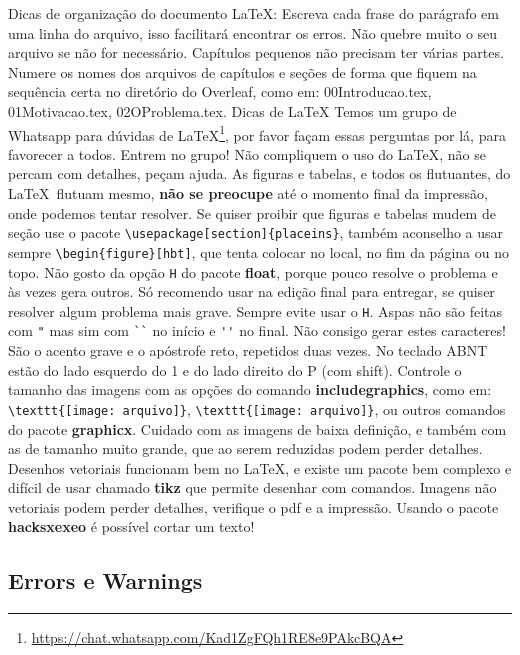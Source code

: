 \documentclass{article}
\begin{document}
\begin{outline}
\begin{outline}
\1 Dicas de organização do documento \LaTeX:
\2 Escreva cada frase do parágrafo em uma linha do arquivo, isso facilitará encontrar os erros.
\2 Não quebre muito o seu arquivo se não for necessário. Capítulos pequenos não precisam ter várias partes.
\2 Numere os nomes dos arquivos de capítulos e seções de forma que fiquem na sequência certa no diretório do Overleaf, como em: 00Introducao.tex, 01Motivacao.tex, 02OProblema.tex.
\1 Dicas de \LaTeX
\2 Temos um grupo de Whatsapp para dúvidas de \LaTeX\footnote{\url{https://chat.whatsapp.com/Kad1ZgFQh1RE8e9PAkcBQA}}, por favor façam essas perguntas por lá, para favorecer a todos. Entrem no grupo!
\2 Não compliquem o uso do \LaTeX, não se percam com detalhes, peçam ajuda. 
\2 As figuras e tabelas, e todos os flutuantes, do \LaTeX\  flutuam mesmo, \textbf{não se preocupe} até o momento final da impressão, onde podemos tentar resolver. 
\2 Se quiser proibir que figuras e tabelas mudem de seção use o pacote \verb!\usepackage[section]{placeins}!, também aconselho a usar sempre \verb!\begin{figure}[hbt]!, que tenta colocar no local, no fim da página ou no topo. 
\3 Não gosto da opção \verb!H! do pacote \textbf{float}, porque pouco resolve o problema e às vezes gera outros. Só recomendo usar na edição final para entregar, se quiser resolver algum problema mais grave. Sempre evite usar o \verb!H!.
\2 Aspas não são feitas com \verb!"! mas sim com \verb!``! no início e \verb!''! no final.
\3 Não consigo gerar estes caracteres! São o acento grave e o apóstrofe reto, repetidos duas vezes. No teclado ABNT estão do lado esquerdo do 1 e do lado direito do P (com shift). 
\2 Controle o tamanho das imagens com as opções do comando \textbf{includegraphics}, como em: \verb!\texttt{[image: arquivo]}!, \verb!\texttt{[image: arquivo]}!, ou outros comandos do pacote \textbf{graphicx}.
\2 Cuidado com as imagens de baixa definição, e também com as de tamanho muito grande, que ao serem reduzidas podem perder detalhes. 
\2 Desenhos vetoriais funcionam bem no \LaTeX, e existe um pacote bem complexo e difícil de usar chamado \textbf{tikz} que permite desenhar com comandos. 
\3 Imagens não vetoriais podem perder detalhes, verifique o pdf e a impressão.
\2 Usando o pacote \textbf{hacksxexeo} é possível cortar um texto! 
\end{outline}




\subsection{Errors e Warnings}


\end{outline}
\end{document}
